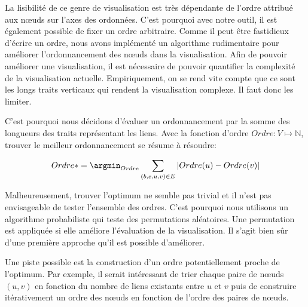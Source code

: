 La lisibilité de ce genre de visualisation est très dépendante de l'ordre attribué aux n\oe{}uds sur l'axes des ordonnées.
C'est pourquoi avec notre outil, il est également possible de fixer un ordre arbitraire.
Comme il peut être fastidieux d'écrire un ordre, nous avons implémenté un algorithme rudimentaire pour améliorer l'ordonnancement des n\oe{}uds dans la visualisation.
Afin de pouvoir améliorer une visualisation, il est nécessaire de pouvoir quantifier la complexité de la visualisation actuelle.
Empiriquement, on se rend vite compte que ce sont les longs traits verticaux qui rendent la visualisation complexe.
Il faut donc les limiter.

C'est pourquoi nous décidons d'évaluer un ordonnancement par la somme des longueurs des traits représentant les liens.
Avec la fonction d'ordre $Ordre: V \longmapsto \mathbb{N}$, trouver le meilleur ordonnancement se résume à résoudre:

\begin{equation}
 Ordre* = \argmin_{Ordre}  \sum_{(b,e,u,v) \in E} |Ordre(u)- Ordre(v)|
\end{equation}

Malheureusement, trouver l'optimum ne semble pas trivial et il n'est pas envisageable de tester l'ensemble des ordres.
C'est pourquoi nous utilisons un algorithme probabiliste qui teste des permutations aléatoires.
Une permutation est appliquée si elle améliore l'évaluation de la visualisation.
Il s'agit bien sûr d'une première approche qu'il est possible d'améliorer.

Une piste possible est la construction d'un ordre potentiellement proche de l'optimum.
Par exemple, il serait intéressant de trier chaque paire de n\oe{}uds $(u,v)$ en fonction du nombre de liens existants entre $u$ et $v$ puis de construire itérativement un ordre des n\oe{}uds en fonction de l'ordre des paires de n\oe{}uds.

